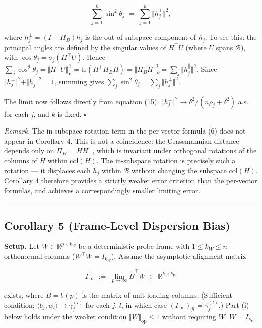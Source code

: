 \documentclass{article}
\theoremstyle{remark}
\begin{document}
\[
\sum_{j=1}^k \sin^2\theta_j \;=\; \sum_{j=1}^k \Vert h_j^\perp\Vert^2,
\]

where $h_j^\perp = (I - \Pi_B)h_j$ is the out-of-subspace component of $h_j$. To see this: the principal angles are defined by the singular values of $H^\top U$ (where $U$ spans $\mathcal{B}$), with $\cos\theta_j = \sigma_j(H^\top U)$. Hence $\sum_j\cos^2\theta_j = \Vert H^\top U\Vert_F^2 = \mathrm{tr}(H^\top\Pi_B H) = \Vert \Pi_B H\Vert_F^2 = \sum_j\Vert h_j^{\parallel}\Vert^2$. Since $\Vert h_j^\perp\Vert^2 + \Vert h_j^{\parallel}\Vert^2 = 1$, summing gives $\sum_j\sin^2\theta_j = \sum_j\Vert h_j^\perp\Vert^2$.

The limit now follows directly from equation (15): $\Vert h_j^\perp\Vert^2\to\delta^2/(n\rho_j+\delta^2)$ a.s. for each $j$, and $k$ is fixed. $\square$

\textit{Remark.} The in-subspace rotation term in the per-vector formula (6) does not appear in Corollary 4. This is not a coincidence: the Grassmannian distance depends only on $\Pi_H = HH^\top$, which is invariant under orthogonal rotations of the columns of $H$ within $\mathrm{col}(H)$. The in-subspace rotation is precisely such a rotation — it displaces each $h_j$ within $\mathcal{B}$ without changing the subspace $\mathrm{col}(H)$. Corollary 4 therefore provides a strictly weaker error criterion than the per-vector formulas, and achieves a correspondingly smaller limiting error.

\medskip\noindent\rule{\linewidth}{0.4pt}\medskip

\subsection{Corollary 5 (Frame-Level Dispersion Bias)}

\textbf{Setup.} Let $W \in \mathbb{R}^{p \times k_W}$ be a deterministic probe frame with $1 \le k_W \le n$ orthonormal columns ($W^\top W = I_{k_W}$). Assume the asymptotic alignment matrix

\[
\Gamma_\infty \;:=\; \lim_{p \to \infty} \tilde{B}^\top W \;\in\; \mathbb{R}^{k \times k_W}
\]

exists, where $\tilde{B} = b(p)$ is the matrix of unit loading columns. (Sufficient condition: $\langle b_j, w_l\rangle \to \gamma_j^{(l)}$ for each $j$, $l$, in which case $(\Gamma_\infty)_{jl} = \gamma_j^{(l)}$.) Part (i) below holds under the weaker condition $\Vert W\Vert_{\mathrm{op}} \le 1$ without requiring $W^\top W = I_{k_W}$.
\end{document}
